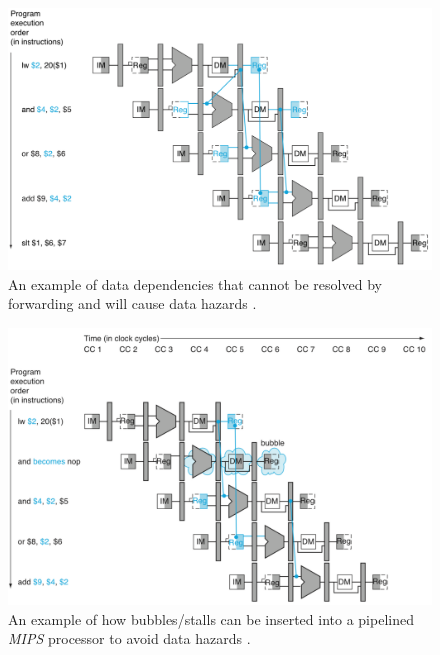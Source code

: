 \begin{figure}[h]
\centering 
\includegraphics[width=6in]{./pics/pipelined-processor-data-hazards}
\caption{An example of data dependencies that cannot be resolved by forwarding and will cause data hazards \cite{Patterson2012}.}
\label{fig:pipelined-processor-data-hazards}
\end{figure}

\begin{figure}[h]
\centering 
\includegraphics[width=6in]{./pics/pipelined-processor-bubbles}
\caption{An example of how bubbles/stalls can be inserted into a pipelined {\it MIPS} processor to avoid data hazards \cite{Patterson2012}.}
\label{fig:pipelinedprocessorbubbles}
\end{figure}

